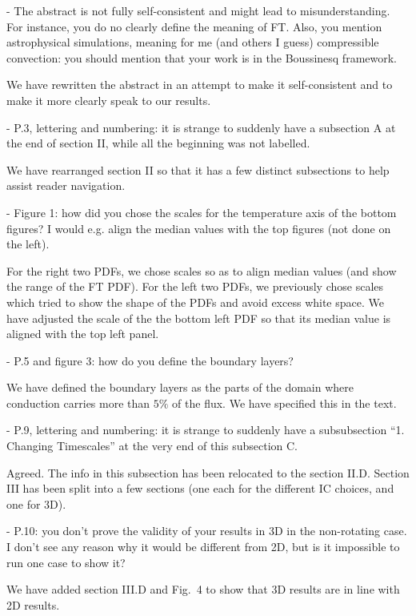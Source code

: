\documentclass[aps, 11pt, singlecolumn]{revtex4-1} %
\begin{document}
\begin{singlespace}
\begin{myquotation}
-       The abstract is not fully self-consistent and might lead to misunderstanding.
For instance, you do no clearly define the meaning of FT. 
Also, you mention astrophysical simulations, meaning for me (and others I guess) compressible convection: you should mention that your work is in the Boussinesq framework.
\end{myquotation}
We have rewritten the abstract in an attempt to make it self-consistent and to make it more clearly speak to our results.
\begin{myquotation}
-       P.3, lettering and numbering: it is strange to suddenly have a subsection A at the end of section II, while all the beginning was not labelled.
\end{myquotation}
We have rearranged section II so that it has a few distinct subsections to help assist reader navigation.
\begin{myquotation}
-       Figure 1: how did you chose the scales for the temperature axis of the bottom figures? 
I would e.g. align the median values with the top figures (not done on the left).
\end{myquotation}
For the right two PDFs, we chose scales so as to align median values (and show the range of the FT PDF).
For the left two PDFs, we previously chose scales which tried to show the shape of the PDFs and avoid excess white space.
We have adjusted the scale of the the bottom left PDF so that its median value is aligned with the top left panel.
\begin{myquotation}
-       P.5 and figure 3: how do you define the boundary layers?
\end{myquotation}
We have defined the boundary layers as the parts of the domain where conduction carries more than $5\%$ of the flux.
We have specified this in the text.
\begin{myquotation}
-       P.9, lettering and numbering: it is strange to suddenly have a subsubsection “1. Changing Timescales” at the very end of this subsection C.
\end{myquotation}
Agreed.
The info in this subsection has been relocated to the section II.D.
Section III has been split into a few sections (one each for the different IC choices, and one for 3D).

\begin{myquotation}
-       P.10: you don’t prove the validity of your results in 3D in the non-rotating case. 
I don’t see any reason why it would be different from 2D, but is it impossible to run one case to show it?
\end{myquotation}
We have added section III.D and Fig.~4 to show that 3D results are in line with 2D results.


\end{singlespace}
\end{document}
